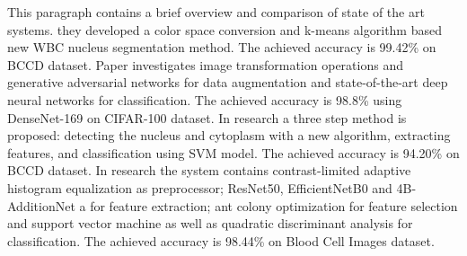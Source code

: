 This paragraph contains a brief overview and comparison of state of the art systems.  
they developed a color space conversion and k-means algorithm based new WBC nucleus segmentation method. The achieved accuracy is 99.42\% on BCCD dataset.
Paper 
investigates image transformation operations and generative adversarial networks for data augmentation and state-of-the-art deep neural networks for classification. The achieved accuracy is 98.8\% using DenseNet-169 on CIFAR-100 dataset.
In
research a three step method is proposed: detecting the nucleus and cytoplasm with a new algorithm, extracting features, and classification using SVM model. The achieved accuracy is 94.20\% on BCCD dataset.
In
 research the system contains contrast-limited adaptive histogram equalization as preprocessor; ResNet50, EfficientNetB0 and 4B-AdditionNet a for feature extraction; ant colony optimization for feature selection and support vector machine as well as quadratic discriminant analysis for classification. The achieved accuracy is 98.44\% on Blood Cell Images dataset.

